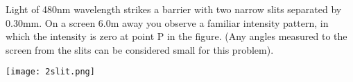 \documentclass{exam}
\begin{document}
\begin{questions}
\question [20] Light of 480nm wavelength strikes a barrier with two narrow slits separated by 0.30mm. On a screen 6.0m away you observe a familiar intensity pattern, in which the intensity is zero at point P in the figure. (Any angles measured to the screen from the slits can be considered small for this problem).

\texttt{[image: 2slit.png]}


\end{questions}
\end{document}
